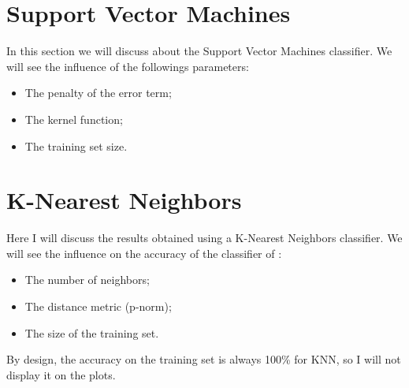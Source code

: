 \documentclass[10pt]{article}
\begin{document}
	\section{Support Vector Machines}
		In this section we will discuss about the Support Vector Machines classifier. We will see the influence of the followings parameters:
		\begin{itemize}
			\item The penalty of the error term;
			\item The kernel function;
			\item The training set size.
		\end{itemize}
	\section{K-Nearest Neighbors}
		Here I will discuss the results obtained using a K-Nearest Neighbors classifier. We will see the influence on the accuracy of the classifier of :
		\begin{itemize}
			\item The number of neighbors;
			\item The distance metric (p-norm);
			\item The size of the training set.
		\end{itemize}
		By design, the accuracy on the training set is always 100\% for KNN, so I will not display it on the plots.
\end{document}
